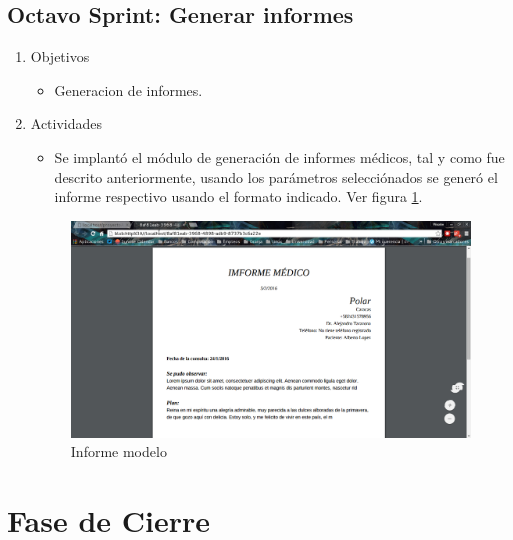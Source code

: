         
    \subsection{Octavo Sprint: Generar informes}
    \begin{enumerate}
        \item Objetivos
        \begin{itemize}
            \item Generacion de informes.
        \end{itemize}
        \item Actividades
        \begin{itemize}
            \item Se implantó el módulo de generación de informes médicos, tal y como fue descrito anteriormente, usando los parámetros selecciónados se generó el informe respectivo usando el formato indicado. Ver figura \ref{informeModelo}.
        \end{itemize}
        
        \begin{figure}[htbp!]
            \begin{center}
                \includegraphics[width=.8\textwidth]{figures/p22}
            \end{center}
            \caption{Informe modelo}
            \label{informeModelo}
        \end{figure}
    \end{enumerate}
        
    
\section{Fase de Cierre}
